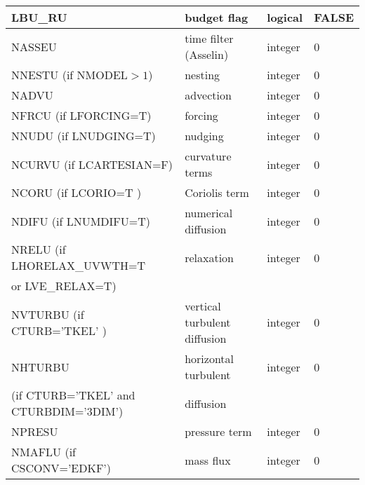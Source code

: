 \begin{center}
\begin{tabular} {|p{8cm}|p{4cm}|>{\centering}p{1.5cm}|p{1.5cm}<{\centering}|}
\hline
LBU\_RU  & budget flag & logical & FALSE  \index{LBU\_RU!\innam{NAM\_BU\_RU}}\\\hline
NASSEU   & time filter (Asselin) & integer  &  0  \index{NASSEU!\innam{NAM\_BU\_RU}} \\\hline
NNESTU (if NMODEL$>1$)   & nesting           & integer  &  0 \index{NNESTU!\innam{NAM\_BU\_RU}} \\\hline
NADVU   & advection  & integer  &  0 \index{NADVU!\innam{NAM\_BU\_RU}} \\\hline
NFRCU (if LFORCING=T)   & forcing           & integer  &  0 \index{NFRCU!\innam{NAM\_BU\_RU}} \\\hline
NNUDU  (if LNUDGING=T)  & nudging           & integer  &  0 \index{NNUDU!\innam{NAM\_BU\_RU}} \\\hline
NCURVU (if LCARTESIAN=F) & curvature terms   & integer  &  0 \index{NCURVU!\innam{NAM\_BU\_RU}} \\\hline
NCORU (if LCORIO=T ) & Coriolis  term    & integer  &  0 \index{NCORU!\innam{NAM\_BU\_RU}}\\\hline
NDIFU (if LNUMDIFU=T) & numerical diffusion & integer  &  0 \index{NDIFU!\innam{NAM\_BU\_RU}} \\\hline
NRELU (if LHORELAX\_UVWTH=T & relaxation  & integer  &  0 \index{NRELU!\innam{NAM\_BU\_RU}} \\
 or LVE\_RELAX=T) &  &   &   \\\hline
NVTURBU (if CTURB='TKEL' ) & vertical turbulent diffusion & integer  &  0 \index{NVTURBU!\innam{NAM\_BU\_RU}}\\\hline
NHTURBU & horizontal turbulent  & integer  &  0 \index{NHTURBU!\innam{NAM\_BU\_RU}}\\
(if CTURB='TKEL' and CTURBDIM='3DIM') &diffusion &   &  \\\hline
NPRESU   & pressure term       & integer  &  0    \index{NPRESU!\innam{NAM\_BU\_RU}} \\\hline
NMAFLU (if CSCONV='EDKF')  & mass flux        & integer  &  0 \index{NMAFLU!\innam{NAM\_BU\_RU}}\\
\hline
\end{tabular}
\end{center}
